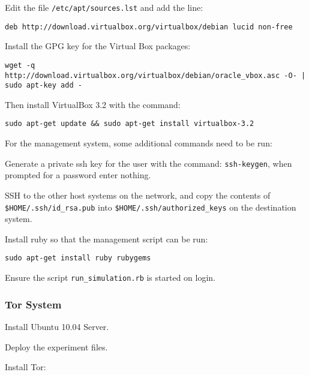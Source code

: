 \begin{enumerate*}
  \item Edit the file \verb+/etc/apt/sources.lst+ and add the line:
  \begin{verbatim}
deb http://download.virtualbox.org/virtualbox/debian lucid non-free
  \end{verbatim}
  \item Install the GPG key for the Virtual Box packages:
  \begin{verbatim}
wget -q http://download.virtualbox.org/virtualbox/debian/oracle_vbox.asc -O- | sudo apt-key add -
  \end{verbatim}
  \item Then install VirtualBox 3.2 with the command:
  \begin{verbatim}
sudo apt-get update && sudo apt-get install virtualbox-3.2
  \end{verbatim}
\end{enumerate*}

For the management system, some additional commands need to be run:

\begin{enumerate*}
  \item Generate a private ssh key for the user with the command: \verb+ssh-keygen+, when prompted for a password enter nothing.
  \item SSH to the other host systems on the network, and copy the contents of \verb+$HOME/.ssh/id_rsa.pub+ into \verb+$HOME/.ssh/authorized_keys+ on the destination system.
  \item Install ruby so that the management script can be run:
    \begin{verbatim}
sudo apt-get install ruby rubygems
    \end{verbatim}
  \item Ensure the script \verb+run_simulation.rb+ is started on login.
\end{enumerate*}

\subsubsection{Tor System}

Install Ubuntu 10.04 Server.

Deploy the experiment files.

Install Tor:

